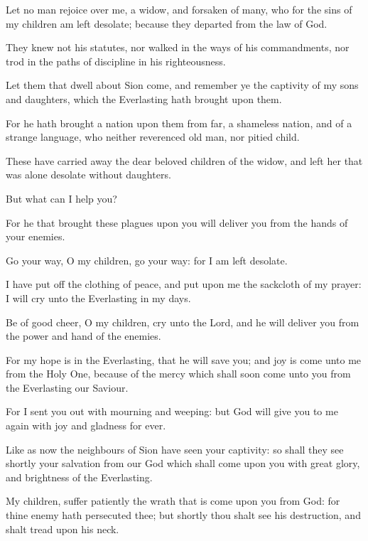 {\par }{\PP {}Let no man rejoice over me, a widow, and forsaken of many, who for the sins of my children am left desolate; because they departed from the law of God.
\par }{\PP {}They knew not his statutes, nor walked in the ways of his commandments, nor trod in the paths of discipline in his righteousness.
\par }{\PP {}Let them that dwell about Sion come, and remember ye the captivity of my sons and daughters, which the Everlasting hath brought upon them.
\par }{\PP {}For he hath brought a nation upon them from far, a shameless nation, and of a strange language, who neither reverenced old man, nor pitied child.
\par }{\PP {}These have carried away the dear beloved children of the widow, and left her that was alone desolate without daughters.
\par }{\PP {}But what can I help you?
\par }{\PP {}For he that brought these plagues upon you will deliver you from the hands of your enemies.
\par }{\PP {}Go your way, O my children, go your way: for I am left desolate.
\par }{\PP {}I have put off the clothing of peace, and put upon me the sackcloth of my prayer: I will cry unto the Everlasting in my days.
\par }{\PP {}Be of good cheer, O my children, cry unto the Lord, and he will deliver you from the power and hand of the enemies.
\par }{\PP {}For my hope is in the Everlasting, that he will save you; and joy is come unto me from the Holy One, because of the mercy which shall soon come unto you from the Everlasting our Saviour.
\par }{\PP {}For I sent you out with mourning and weeping: but God will give you to me again with joy and gladness for ever.
\par }{\PP {}Like as now the neighbours of Sion have seen your captivity: so shall they see shortly your salvation from our God which shall come upon you with great glory, and brightness of the Everlasting.
\par }{\PP {}My children, suffer patiently the wrath that is come upon you from God: for thine enemy hath persecuted thee; but shortly thou shalt see his destruction, and shalt tread upon his neck.
}
